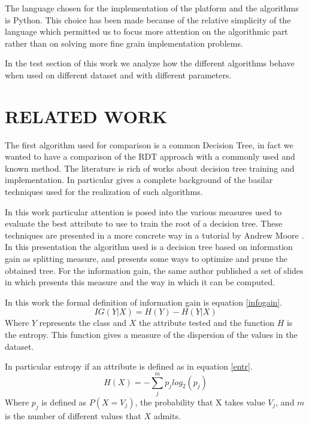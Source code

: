 \documentclass{acm_proc_article-sp-sigmod07}
\begin{document}
The language chosen for the implementation of the platform and the
algorithms is Python. This choice has been made because of the relative
simplicity of the language which permitted us to focus more attention on
the algorithmic part rather than on solving more fine grain implementation
problems.

In the test section of this work we analyze how the different algorithms
behave when used on different dataset and with different parameters. 

\section{RELATED WORK}

The first algorithm used for comparison is a common Decision Tree, in fact
we wanted to have a comparison of the RDT approach with a commonly used
and known method.
The literature is rich of works about decision tree training and
implementation. In particular \cite{quinlan:induction} gives a complete
background of the basilar techniques used for the realization of such
algorithms.

In this work particular attention is posed into the various measures used
to evaluate the best attribute to use to train the root of a decision
tree.
These techniques are presented in a more concrete way in a tutorial by
Andrew Moore \cite{moore:dtree}. In this presentation the algorithm used is
a decision tree based on information gain as splitting measure, and
presents some ways to optimize and prune the obtained tree.
For the information gain, the same author published a set of slides
in which presents this measure and the way in which it can be computed.

In this work the formal definition of information gain is equation
\ref{infogain}.
\begin{equation}
IG(Y|X) = H(Y) - H(Y|X)
\label{infogain}
\end{equation}
Where $Y$ represents the class and $X$ the attribute tested and the
function $H$ is the entropy.
This function gives a measure of the dispersion of the values in the
dataset.

In particular entropy if an attribute is defined as in equation
\ref{entr}.
\begin{equation}
H(X) = -\sum_{j}^{m} p_j log_2(p_j)
\label{entr}
\end{equation}
Where $p_j$ is defined as $P(X = V_j)$, the probability that X takes value
$V_j$, and $m$ is the number of different values that $X$ admits.
\end{document}
